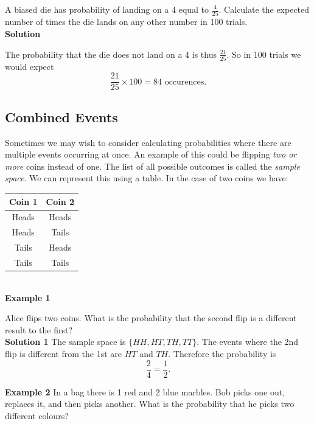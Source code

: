 \documentclass{article}
\begin{document}
A biased die has probability of landing on a 4 equal to \(\frac{4}{25}\). Calculate the expected number of times the die lands on any other number in 100 trials.
\\

\textbf{Solution}

The probability that the die does not land on a 4 is thus \(\frac{21}{25}\). So in 100 trials we would expect
\[
\frac{21}{25} \times 100 = 84 \text{ occurences.}
\]

\newpage

\subsection{Combined Events}

Sometimes we may wish to consider calculating probabilities where there are multiple events occurring at once. An example of this could be flipping \textit{two or more} coins instead of one. The list of all possible outcomes is called the \textit{sample space}. We can represent this using a table. In the case of two coins we have:

\begin{table}[h]
    \centering
    \begin{tabular}{|c|c|}
    \hline
         Coin 1 & Coin 2 \\
         \hline
         Heads & Heads \\
         Heads & Tails \\
         Tails & Heads \\
         Tails & Tails \\
         \hline
    \end{tabular}
    \label{tab:my_label}
\end{table}
\\

\textbf{Example 1}

Alice flips two coins. What is the probability that the second flip is a different result to the first?
\\

\textbf{Solution 1}
The sample space is \(\{HH, HT, TH, TT\}\). The events where the 2nd flip is different from the 1st are \(HT\) and \(TH\). Therefore the probability is
\[
\frac{2}{4} = \frac{1}{2}.
\]

\textbf{Example 2}
In a bag there is 1 red and 2 blue marbles. Bob picks one out, replaces it, and then picks another. What is the probability that he picks two different colours?
\\
\end{document}
